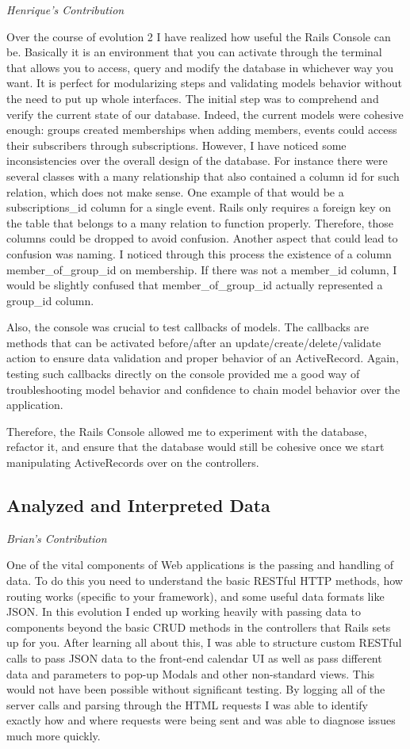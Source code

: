 \documentclass[11pt]{article}
\begin{document}
\textit{Henrique's Contribution}

Over the course of evolution 2 I have realized how useful the Rails Console can be. Basically it is an environment that you can activate through the terminal that allows you to access, query and modify the database in whichever way you want. It is perfect for modularizing steps and validating models behavior without the need to put up whole interfaces. The initial step was to comprehend and verify the current state of our database. Indeed, the current models were cohesive enough: groups created memberships when adding members, events could access their subscribers through subscriptions. However, I have noticed some inconsistencies over the overall design of the database. For instance there were several classes with a many relationship that also contained a column id for such relation, which does not make sense. One example of that would be a subscriptions_id column for a single event. Rails only requires a foreign key on the table that belongs to a many relation to function properly. Therefore, those columns could be dropped to avoid confusion. Another aspect that could lead to confusion was naming. I noticed through this process the existence of a column member_of_group_id on membership. If there was not a member_id column, I would be slightly confused that member_of_group_id actually represented a group_id column.

Also, the console was crucial to test callbacks of models. The callbacks are methods that can be activated before/after an update/create/delete/validate action to ensure data validation and proper behavior of an ActiveRecord. Again, testing such callbacks directly on the console provided me a good way of troubleshooting model behavior and confidence to chain model behavior over the application.

Therefore, the Rails Console allowed me to experiment with the database, refactor it, and ensure that the database would still be cohesive once we start manipulating ActiveRecords over on the controllers.

\subsection{Analyzed and Interpreted Data}

\textit{Brian's Contribution}

One of the vital components of Web applications is the passing and handling of data. To do this you need to understand the basic RESTful HTTP methods, how routing works (specific to your framework), and some useful data formats like JSON. In this evolution I ended up working heavily with passing data to components beyond the basic CRUD methods in the controllers that Rails sets up for you. After learning all about this, I was able to structure custom RESTful calls to pass JSON data to the front-end calendar UI as well as pass different data and parameters to pop-up Modals and other non-standard views. This would not have been possible without significant testing. By logging all of the server calls and parsing through the HTML requests I was able to identify exactly how and where requests were being sent and was able to diagnose issues much more quickly. 
\end{document}
